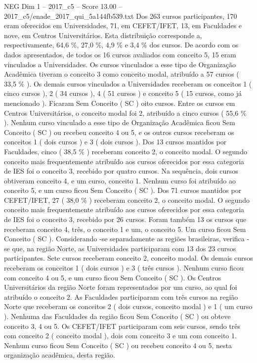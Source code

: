 \begin{textsample}{NEG Dim 1 – 2017\_c5 – Score 13.00 – 2017\_c5/enade\_2017\_qui\_5a144fb539.txt}
Dos 263 cursos participantes, 170 eram oferecidos em Universidades, 71, em CEFET/IFET, 13, em Faculdades e nove, em Centros Universitários.
Esta distribuição corresponde a, respectivamente, 64,6 \%, 27,0 \%, 4,9 \% e 3,4 \% dos cursos.
De acordo com os dados apresentados, de todos os 16 cursos avaliados com conceito 5, 15 eram vinculados a Universidades.
Os cursos vinculados a esse tipo de Organização Acadêmica tiveram o conceito 3 como conceito modal, atribuído a 57 cursos ( 33,5 \% ).
Os demais cursos vinculados a Universidades receberam os conceitos 1 ( cinco cursos ), 2 ( 34 cursos ), 4 ( 51 cursos ) e conceito 5 ( 15 cursos, como já mencionado ).
Ficaram Sem Conceito ( SC ) oito cursos.
Entre os cursos em Centros Universitários, o conceito modal foi 2, atribuído a cinco cursos ( 55,6 \% ).
Nenhum curso vinculado a esse tipo de Organização Acadêmica ficou Sem Conceito ( SC ) ou recebeu conceito 4 ou 5, e os outros cursos receberam os conceitos 1 ( dois cursos ) e 3 ( dois cursos ).
Dos 13 cursos mantidos por Faculdades, cinco ( 38,5 \% ) receberam conceito 2, o conceito modal.
O segundo conceito mais frequentemente atribuído aos cursos oferecidos por essa categoria de IES foi o conceito 3, recebido por quatro cursos.
Na sequência, dois cursos obtiveram conceito 4, e um curso, conceito 1.
Nenhum curso foi atribuído ao conceito 5, e um curso ficou Sem Conceito ( SC ).
Dos 71 cursos mantidos por CEFET/IFET, 27 ( 38,0 \% ) receberam conceito 2, o conceito modal.
O segundo conceito mais frequentemente atribuído aos cursos oferecidos por essa categoria de IES foi o conceito 3, recebido por 26 cursos.
Foram também 13 os cursos que receberam conceito 4, três, o conceito 1 e um, o conceito 5.
Um curso ficou Sem Conceito ( SC ).
Considerando -se separadamente as regiões brasileiras, verifica -se que, na região Norte, as Universidades participaram com 13 dos 23 cursos participantes.
Sete cursos receberam conceito 2, conceito modal.
Os demais cursos receberam os conceitos 1 ( dois cursos ) e 3 ( três cursos ).
Nenhum curso ficou com conceito 4 ou 5, e um curso ficou Sem Conceito ( SC ).
Os Centros Universitários da região Norte foram representados por um curso, ao qual foi atribuído o conceito 2.
As Faculdades participaram com três cursos na região Norte que receberam os conceitos 2 ( dois cursos, conceito modal ) e 1 ( um curso ).
Nenhuma das Faculdades da região ficou Sem Conceito ( SC ) ou obteve conceito 3, 4 ou 5.
Os CEFET/IFET participaram com seis cursos, sendo três com conceito 2 ( conceito modal ), dois com conceito 3 e um com conceito 1.
Nenhum curso ficou Sem Conceito ( SC ) ou recebeu conceito 4 ou 5, nesta organização acadêmica, desta região.

\end{textsample}
